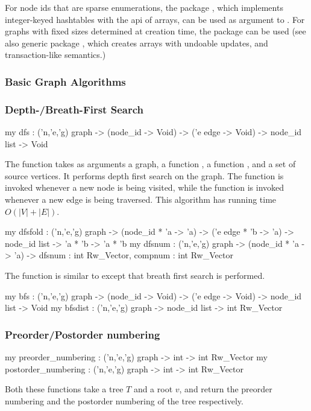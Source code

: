 For node ids that are sparse enumerations, the package , 
which implements integer-keyed hashtables
with the api of arrays, can be used
as argument to .  
For graphs with fixed sizes determined at creation time,
the package  can be used (see also 
generic package ,
which creates arrays with undoable updates, and transaction-like semantics.)

\subsubsection{Basic Graph Algorithms}

\subsubsection{Depth-/Breath-First Search}

\begin{SML}
   my dfs : ('n,'e,'g) graph  ->
             (node_id -> Void) ->
             ('e edge -> Void) ->
             node_id list -> Void
\end{SML}
   The function  takes as arguments a graph,
a function , a function 
, and a
set of source vertices.  It performs depth first search on the
graph.  The function  is invoked 
whenever a new node is being visited, while the function 
is invoked whenever a new edge is being traversed.
This algorithm has running time $O(|V|+|E|)$.

\begin{SML}
   my dfsfold : ('n,'e,'g) graph  ->
                 (node_id * 'a -> 'a) ->
                 ('e edge * 'b -> 'a) ->
                 node_id list -> 'a * 'b -> 'a * 'b
   my dfsnum :  ('n,'e,'g) graph  ->
                 (node_id * 'a -> 'a) ->
                 { dfsnum : int Rw_Vector, compnum : int Rw_Vector }
\end{SML}

   The function  is similar to 
except that breath first search is performed.
\begin{SML} 
   my bfs : ('n,'e,'g) graph  ->
             (node_id -> Void) ->
             ('e edge -> Void) ->
             node_id list -> Void
   my bfsdist : ('n,'e,'g) graph -> node_id list -> int Rw_Vector
\end{SML} 

\subsubsection{Preorder/Postorder numbering}
\begin{SML}
   my preorder_numbering  : ('n,'e,'g) graph -> int -> int Rw_Vector
   my postorder_numbering : ('n,'e,'g) graph -> int -> int Rw_Vector
\end{SML}  
   Both these functions take a tree $T$ and a root $v$, and return
the preorder numbering and the postorder numbering of the tree respectively. 

